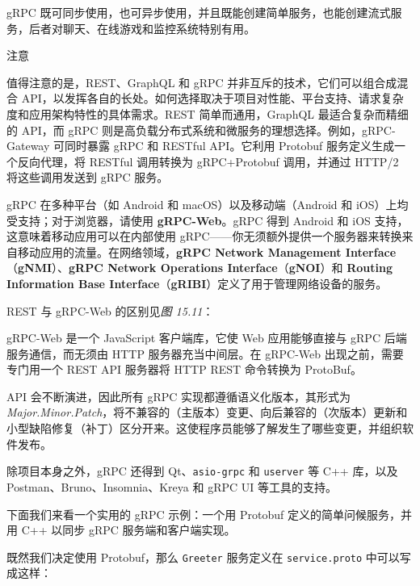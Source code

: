gRPC 既可同步使用，也可异步使用，并且既能创建简单服务，也能创建流式服务，后者对聊天、在线游戏和监控系统特别有用。

\begin{myNotic}{注意}

值得注意的是，REST、GraphQL 和 gRPC 并非互斥的技术，它们可以组合成混合 API，以发挥各自的长处。如何选择取决于项目对性能、平台支持、请求复杂度和应用架构特性的具体需求。REST 简单而通用，GraphQL 最适合复杂而精细的 API，而 gRPC 则是高负载分布式系统和微服务的理想选择。例如，gRPC-Gateway 可同时暴露 gRPC 和 RESTful API。它利用 Protobuf 服务定义生成一个反向代理，将 RESTful 调用转换为 gRPC+Protobuf 调用，并通过 HTTP/2 将这些调用发送到 gRPC 服务。
\end{myNotic}

\label{idx:1697}
\label{idx:1698}
\label{idx:1699}
\label{idx:1700}
\label{idx:1701}
gRPC 在多种平台（如 Android 和 macOS）以及移动端（Android 和 iOS）上均受支持；对于浏览器，请使用 \textbf{gRPC-Web}。gRPC 得到 Android 和 iOS 支持，这意味着移动应用可以在内部使用 gRPC——你无须额外提供一个服务器来转换来自移动应用的流量。在网络领域，\textbf{gRPC Network Management Interface}（\textbf{gNMI}）、\textbf{gRPC Network Operations Interface}（\textbf{gNOI}）和 \textbf{Routing Information Base Interface}（\textbf{gRIBI}）定义了用于管理网络设备的服务。

REST 与 gRPC-Web 的区别见\emph{图 15.11}：


gRPC-Web 是一个 JavaScript 客户端库，它使 Web 应用能够直接与 gRPC 后端服务通信，而无须由 HTTP 服务器充当中间层。在 gRPC-Web 出现之前，需要专门用一个 REST API 服务器将 HTTP REST 命令转换为 ProtoBuf。

\label{idx:1702}
\label{idx:1703}
API 会不断演进，因此所有 gRPC 实现都遵循语义化版本，其形式为 \emph{Major.Minor.Patch}，将不兼容的（主版本）变更、向后兼容的（次版本）更新和小型缺陷修复（补丁）区分开来。这使程序员能够了解发生了哪些变更，并组织软件发布。

除项目本身之外，gRPC 还得到 Qt、\texttt{asio-grpc} 和 \texttt{userver} 等 C++ 库，以及 Postman、Bruno、Insomnia、Kreya 和 gRPC UI 等工具的支持。

下面我们来看一个实用的 gRPC 示例：一个用 Protobuf 定义的简单问候服务，并用 C++ 以同步 gRPC 服务端和客户端实现。

既然我们决定使用 Protobuf，那么 \texttt{Greeter} 服务定义在 \texttt{service.\allowbreak{}proto} 中可以写成这样：

